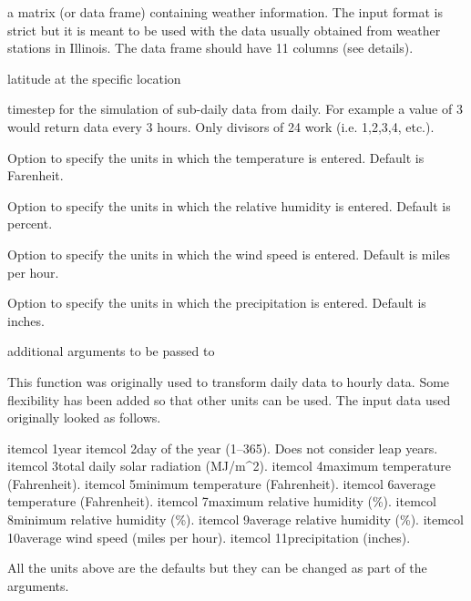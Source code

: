 \documentclass[letterpaper]{book}
\begin{document}
%
\begin{Arguments}
\begin{ldescription}
\item[\code{X}] a matrix (or data frame) containing weather
information.  The input format is strict but it is meant
to be used with the data usually obtained from weather
stations in Illinois. The data frame should have 11
columns (see details).

\item[\code{lati}] latitude at the specific location

\item[\code{ts}] timestep for the simulation of sub-daily data
from daily. For example a value of 3 would return data
every 3 hours. Only divisors of 24 work (i.e. 1,2,3,4,
etc.).

\item[\code{temp.units}] Option to specify the units in which
the temperature is entered. Default is Farenheit.

\item[\code{rh.units}] Option to specify the units in which the
relative humidity is entered. Default is percent.

\item[\code{ws.units}] Option to specify the units in which the
wind speed is entered. Default is miles per hour.

\item[\code{pp.units}] Option to specify the units in which the
precipitation is entered. Default is inches.

\item[\code{list()}] additional arguments to be passed to
\end{ldescription}
\end{Arguments}
%
\begin{Details}\relax
This function was originally used to transform daily data
to hourly data. Some flexibility has been added so that
other units can be used. The input data used originally
looked as follows. \begin{enumerate}


\bsl{}itemcol 1year \bsl{}itemcol 2day of the year (1--365). Does
not consider leap years. \bsl{}itemcol 3total daily solar
radiation (MJ/m\textasciicircum{}2). \bsl{}itemcol 4maximum temperature
(Fahrenheit). \bsl{}itemcol 5minimum temperature (Fahrenheit).
\bsl{}itemcol 6average temperature (Fahrenheit). \bsl{}itemcol
7maximum relative humidity (\%). \bsl{}itemcol 8minimum
relative humidity (\%). \bsl{}itemcol 9average relative
humidity (\%). \bsl{}itemcol 10average wind speed (miles per
hour). \bsl{}itemcol 11precipitation (inches). 
\end{enumerate}


All the units above are the defaults but they can be
changed as part of the arguments.
\end{Details}
\end{document}
